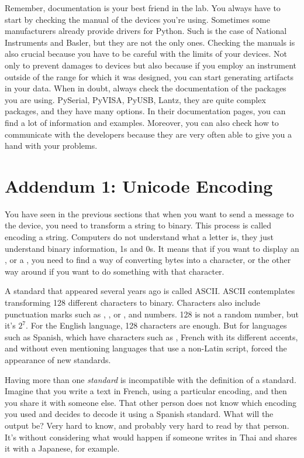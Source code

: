Remember, documentation is your best friend in the lab. You always have to start by checking the manual of the devices you're using. Sometimes some manufacturers already provide drivers for Python. Such is the case of National Instruments and Basler, but they are not the only ones. Checking the manuals is also crucial because you have to be careful with the limits of your devices. Not only to prevent damages to devices but also because if you employ an instrument outside of the range for which it was designed, you can start generating artifacts in your data. When in doubt, always check the documentation of the packages you are using. PySerial, PyVISA, PyUSB, Lantz, they are quite complex packages, and they have many options. In their documentation pages, you can find a lot of information and examples. Moreover, you can also check how to communicate with the developers because they are very often able to give you a hand with your problems.

\section{Addendum 1: Unicode Encoding}\label{sec:unicode}
You have seen in the previous sections that when you want to send a message to the device, you need to transform a string to binary. This process is called encoding a string. Computers do not understand what a letter is, they just understand binary information, 1s and 0s. It means that if you want to display an , or a , you need to find a way of converting bytes into a character, or the other way around if you want to do something with that character.

A standard that appeared several years ago is called ASCII. ASCII contemplates transforming 128 different characters to binary. Characters also include punctuation marks such as , \py{!}, or \py{:}, and numbers. 128 is not a random number, but it's $2^7$. For the English language, 128 characters are enough. But for languages such as Spanish, which have characters such as , French with its different accents, and without even mentioning languages that use a non-Latin script, forced the appearance of new standards.

Having more than one \textit{standard} is incompatible with the definition of a standard. Imagine that you write a text in French, using a particular encoding, and then you share it with someone else. That other person does not know which encoding you used and decides to decode it using a Spanish standard. What will the output be? Very hard to know, and probably very hard to read by that person. It's without considering what would happen if someone writes in Thai and shares it with a Japanese, for example.

